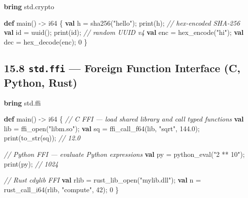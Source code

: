 \documentclass[
  english,
]{book}
\newenvironment{Shaded}{\begin{snugshade}}{\end{snugshade}}
\newcommand{\CommentTok}[1]{\textcolor[rgb]{0.42,0.60,0.33}{\textit{#1}}}
\newcommand{\DataTypeTok}[1]{\textcolor[rgb]{0.31,0.79,0.69}{#1}}
\newcommand{\DecValTok}[1]{\textcolor[rgb]{0.71,0.81,0.66}{#1}}
\newcommand{\FloatTok}[1]{\textcolor[rgb]{0.71,0.81,0.66}{#1}}
\newcommand{\FunctionTok}[1]{\textcolor[rgb]{0.86,0.86,0.67}{#1}}
\newcommand{\KeywordTok}[1]{\textcolor[rgb]{0.34,0.61,0.84}{\textbf{#1}}}
\newcommand{\NormalTok}[1]{\textcolor[rgb]{0.83,0.83,0.83}{#1}}
\newcommand{\OperatorTok}[1]{\textcolor[rgb]{0.83,0.83,0.83}{#1}}
\newcommand{\StringTok}[1]{\textcolor[rgb]{0.81,0.57,0.47}{#1}}
\begin{document}
\begin{Shaded}
\begin{Highlighting}[]
\KeywordTok{bring}\NormalTok{ std}\OperatorTok{.}\NormalTok{crypto}

\KeywordTok{def}\NormalTok{ main() }\OperatorTok{{-}\textgreater{}} \DataTypeTok{i64}\NormalTok{ \{}
    \KeywordTok{val}\NormalTok{ h }\OperatorTok{=} \FunctionTok{sha256}\NormalTok{(}\StringTok{"hello"}\NormalTok{);}
    \FunctionTok{print}\NormalTok{(h);                    }\CommentTok{// hex{-}encoded SHA{-}256}
    \KeywordTok{val}\NormalTok{ id }\OperatorTok{=} \FunctionTok{uuid}\NormalTok{();}
    \FunctionTok{print}\NormalTok{(id);                   }\CommentTok{// random UUID v4}
    \KeywordTok{val}\NormalTok{ enc }\OperatorTok{=} \FunctionTok{hex\_encode}\NormalTok{(}\StringTok{"hi"}\NormalTok{);}
    \KeywordTok{val}\NormalTok{ dec }\OperatorTok{=} \FunctionTok{hex\_decode}\NormalTok{(enc);}
    \DecValTok{0}
\NormalTok{\}}
\end{Highlighting}
\end{Shaded}

\subsection{\texorpdfstring{15.8 \texttt{std.ffi} --- Foreign Function
Interface (C, Python,
Rust)}{15.8 std.ffi --- Foreign Function Interface (C, Python, Rust)}}\label{std.ffi-foreign-function-interface-c-python-rust}

\begin{Shaded}
\begin{Highlighting}[]
\KeywordTok{bring}\NormalTok{ std}\OperatorTok{.}\NormalTok{ffi}

\KeywordTok{def}\NormalTok{ main() }\OperatorTok{{-}\textgreater{}} \DataTypeTok{i64}\NormalTok{ \{}
    \CommentTok{// C FFI — load shared library and call typed functions}
    \KeywordTok{val}\NormalTok{ lib }\OperatorTok{=} \FunctionTok{ffi\_open}\NormalTok{(}\StringTok{"libm.so"}\NormalTok{);}
    \KeywordTok{val}\NormalTok{ sq }\OperatorTok{=} \FunctionTok{ffi\_call\_f64}\NormalTok{(lib, }\StringTok{"sqrt"}\NormalTok{, }\FloatTok{144.0}\NormalTok{);}
    \FunctionTok{print}\NormalTok{(}\FunctionTok{to\_str}\NormalTok{(sq));    }\CommentTok{// 12.0}

    \CommentTok{// Python FFI — evaluate Python expressions}
    \KeywordTok{val}\NormalTok{ py }\OperatorTok{=} \FunctionTok{python\_eval}\NormalTok{(}\StringTok{"2 ** 10"}\NormalTok{);}
    \FunctionTok{print}\NormalTok{(py);            }\CommentTok{// 1024}

    \CommentTok{// Rust cdylib FFI}
    \KeywordTok{val}\NormalTok{ rlib }\OperatorTok{=} \FunctionTok{rust\_lib\_open}\NormalTok{(}\StringTok{"mylib.dll"}\NormalTok{);}
    \KeywordTok{val}\NormalTok{ n }\OperatorTok{=} \FunctionTok{rust\_call\_i64}\NormalTok{(rlib, }\StringTok{"compute"}\NormalTok{, }\DecValTok{42}\NormalTok{);}
    \DecValTok{0}
\NormalTok{\}}
\end{Highlighting}
\end{Shaded}
\end{document}
